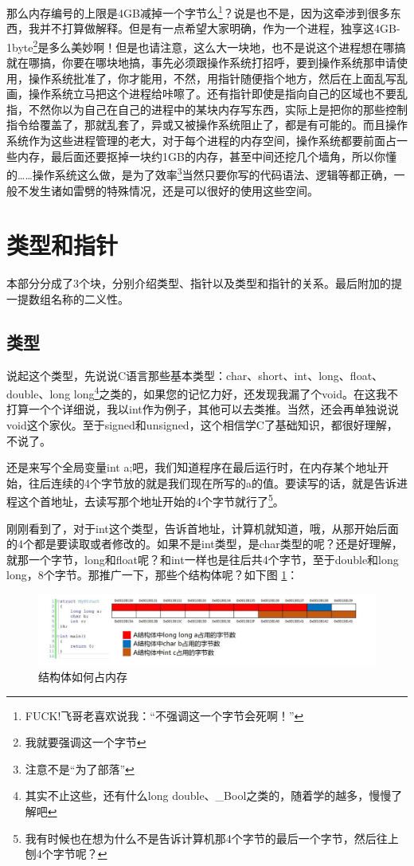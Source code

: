 \documentclass[11pt,twoside,a4paper,titlepage]{article}	%
\begin{document}
那么内存编号的上限是4GB减掉一个字节么\footnote{FUCK!飞哥老喜欢说我：“不强调这一个字节会死啊！”}？说是也不是，因为这牵涉到很多东西，我并不打算做解释。但是有一点希望大家明确，作为一个进程，独享这4GB-1byte\footnote{我就要强调这一个字节}是多么美妙啊！但是也请注意，这么大一块地，也不是说这个进程想在哪搞就在哪搞，你要在哪块地搞，事先必须跟操作系统打招呼，要到操作系统那申请使用，操作系统批准了，你才能用，不然，用指针随便指个地方，然后在上面乱写乱画，操作系统立马把这个进程给咔嚓了。还有指针即使是指向自己的区域也不要乱指，不然你以为自己在自己的进程中的某块内存写东西，实际上是把你的那些控制指令给覆盖了，那就乱套了，异或又被操作系统阻止了，都是有可能的。而且操作系统作为这些进程管理的老大，对于每个进程的内存空间，操作系统都要前面占一些内存，最后面还要抠掉一块约1GB的内存，甚至中间还挖几个墙角，所以你懂的……操作系统这么做，是为了效率\footnote{注意不是“为了部落”}当然只要你写的代码语法、逻辑等都正确，一般不发生诸如雷劈的特殊情况，还是可以很好的使用这些空间。


\newpage
\section{类型和指针}
本部分分成了3个块，分别介绍类型、指针以及类型和指针的关系。最后附加的提一提数组名称的二义性。

\subsection{类型}
说起这个类型，先说说C语言那些基本类型：char、short、int、long、float、double、long long\footnote{其实不止这些，还有什么long double、\_Bool之类的，随着学的越多，慢慢了解吧}之类的，如果您的记忆力好，还发现我漏了个void。在这我不打算一个个详细说，我以int作为例子，其他可以去类推。当然，还会再单独说说void这个家伙。至于signed和unsigned，这个相信学C了基础知识，都很好理解，不说了。

还是来写个全局变量int a;吧，我们知道程序在最后运行时，在内存某个地址开始，往后连续的4个字节放的就是我们现在所写的a的值。要读写的话，就是告诉进程这个首地址，去读写那个地址开始的4个字节就行了\footnote{我有时候也在想为什么不是告诉计算机那4个字节的最后一个字节，然后往上刨4个字节呢？}。

刚刚看到了，对于int这个类型，告诉首地址，计算机就知道，哦，从那开始后面的4个都是要读取或者修改的。如果不是int类型，是char类型的呢？还是好理解，就那一个字节，long和float呢？和int一样也是往后共4个字节，至于double和long long，8个字节。那推广一下，那些个结构体呢？如下图 \ref{fig:struct_01}：

\begin{figure}[bpht]
\centering
\includegraphics[scale=.5]{../src/struct_01.jpg}
\caption{结构体如何占内存}
\label{fig:struct_01}
\end{figure}
\end{document}
